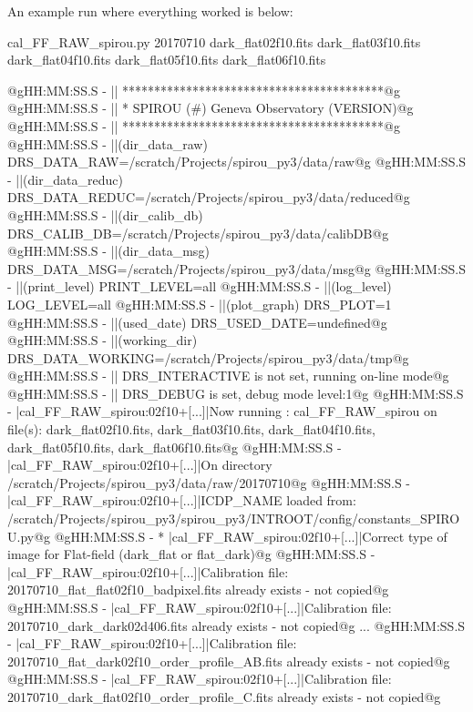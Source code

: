 An example run where everything worked is below:
\begin{cmdbox}[title={example}]
cal_FF_RAW_spirou.py 20170710 dark_flat02f10.fits dark_flat03f10.fits dark_flat04f10.fits dark_flat05f10.fits dark_flat06f10.fits
\end{cmdbox}
\begin{cmdboxprintspecial}[fontupper=\tiny, fontlower=\tiny]
@gHH:MM:SS.S -   || *****************************************@g
@gHH:MM:SS.S -   || * SPIROU \@(#) Geneva Observatory (VERSION)@g
@gHH:MM:SS.S -   || *****************************************@g
@gHH:MM:SS.S -   ||(dir_data_raw)      DRS_DATA_RAW=/scratch/Projects/spirou_py3/data/raw@g
@gHH:MM:SS.S -   ||(dir_data_reduc)    DRS_DATA_REDUC=/scratch/Projects/spirou_py3/data/reduced@g
@gHH:MM:SS.S -   ||(dir_calib_db)      DRS_CALIB_DB=/scratch/Projects/spirou_py3/data/calibDB@g
@gHH:MM:SS.S -   ||(dir_data_msg)      DRS_DATA_MSG=/scratch/Projects/spirou_py3/data/msg@g
@gHH:MM:SS.S -   ||(print_level)       PRINT_LEVEL=all         %
@gHH:MM:SS.S -   ||(log_level)         LOG_LEVEL=all         %
@gHH:MM:SS.S -   ||(plot_graph)        DRS_PLOT=1            %
@gHH:MM:SS.S -   ||(used_date)         DRS_USED_DATE=undefined@g
@gHH:MM:SS.S -   ||(working_dir)       DRS_DATA_WORKING=/scratch/Projects/spirou_py3/data/tmp@g
@gHH:MM:SS.S -   ||                    DRS_INTERACTIVE is not set, running on-line mode@g
@gHH:MM:SS.S -   ||                    DRS_DEBUG is set, debug mode level:1@g
@gHH:MM:SS.S -   |cal_FF_RAW_spirou:02f10+[...]|Now running : cal_FF_RAW_spirou on file(s): dark_flat02f10.fits, dark_flat03f10.fits, dark_flat04f10.fits, dark_flat05f10.fits, dark_flat06f10.fits@g
@gHH:MM:SS.S -   |cal_FF_RAW_spirou:02f10+[...]|On directory /scratch/Projects/spirou_py3/data/raw/20170710@g
@gHH:MM:SS.S -   |cal_FF_RAW_spirou:02f10+[...]|ICDP_NAME loaded from: /scratch/Projects/spirou_py3/spirou_py3/INTROOT/config/constants_SPIROU.py@g
@gHH:MM:SS.S - * |cal_FF_RAW_spirou:02f10+[...]|Correct type of image for Flat-field (dark_flat or flat_dark)@g
@gHH:MM:SS.S -   |cal_FF_RAW_spirou:02f10+[...]|Calibration file: 20170710_flat_flat02f10_badpixel.fits already exists - not copied@g
@gHH:MM:SS.S -   |cal_FF_RAW_spirou:02f10+[...]|Calibration file: 20170710_dark_dark02d406.fits already exists - not copied@g
...
@gHH:MM:SS.S -   |cal_FF_RAW_spirou:02f10+[...]|Calibration file: 20170710_flat_dark02f10_order_profile_AB.fits already exists - not copied@g
@gHH:MM:SS.S -   |cal_FF_RAW_spirou:02f10+[...]|Calibration file: 20170710_dark_flat02f10_order_profile_C.fits already exists - not copied@g

\end{cmdboxprintspecial}
